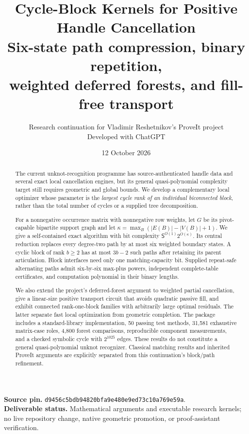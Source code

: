 \documentclass[11pt,letterpaper]{article}
\title{\textbf{Cycle-Block Kernels for Positive Handle Cancellation}\\[5pt]
\large Six-state path compression, binary repetition,\\weighted deferred forests, and fill-free transport}
\author{Research continuation for Vladimir Reshetnikov's ProveIt project\\
\small Developed with ChatGPT}
\date{12 October 2026}
\theoremstyle{definition}
\theoremstyle{remark}
\newcommand{\size}{\mathsf S}
\begin{document}
\maketitle
\begin{abstract}
The current unknot-recognition programme has source-authenticated handle data and several exact local cancellation engines, but its general quasi-polynomial complexity target still requires geometric and global bounds. We develop a complementary local optimizer whose parameter is the \emph{largest cycle rank of an individual biconnected block}, rather than the total number of cycles or a supplied tree decomposition.

For a nonnegative occurrence matrix with nonnegative row weights, let $G$ be its pivot-capable bipartite support graph and let $\kappa=\max_B(|E(B)|-|V(B)|+1)$. We give a self-contained exact algorithm with bit complexity $\size^{O(1)}2^{O(\kappa)}$. Its central reduction replaces every degree-two path by at most six weighted boundary states. A cyclic block of rank $b\ge2$ has at most $3b-2$ such paths after retaining its parent articulation. Block interfaces need only one matching-capacity bit. Supplied repeat-safe alternating paths admit six-by-six max-plus powers, independent complete-table certificates, and computation polynomial in their binary lengths.

We also extend the project's deferred-forest argument to weighted partial cancellation, give a linear-size positive transport circuit that avoids quadratic passive fill, and exhibit connected rank-one-block families with arbitrarily large optimal residuals. The latter separate fast local optimization from geometric completion. The package includes a standard-library implementation, 50 passing test methods, 31,581 exhaustive matrix-case roles, 4,800 forest comparisons, reproducible component measurements, and a checked symbolic cycle with $2^{1025}$ edges. These results do not constitute a general quasi-polynomial unknot recognizer. Classical matching results and inherited ProveIt arguments are explicitly separated from this continuation's block/path refinement.
\end{abstract}
\vspace{4pt}
\noindent\textbf{Source pin.} \nolinkurl{d9456c5bdb94820bfa9e480e9ed73c10a769e59a}.\\
\textbf{Deliverable status.} Mathematical arguments and executable research kernels; no live repository change, native geometric promotion, or proof-assistant verification.
\newpage
\tableofcontents
\newpage
\end{document}

